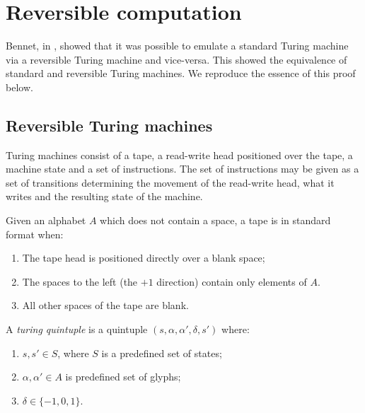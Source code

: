 
\chapter{Reversible computation}\label{chap:reversible_computation}

Bennet, in \cite{bennett:1973reverse}, showed that it was possible to
emulate a standard Turing machine via a reversible Turing machine and
vice-versa. This showed the equivalence of  standard and reversible
Turing machines. We reproduce the essence of this proof below.

\section{Reversible Turing machines} %
\label{sec:reversible_turing_machines}

Turing machines consist of a tape, a read-write head positioned over
the tape, a machine state and a set of instructions. The set of instructions
may be given as a set of transitions determining the movement of the
read-write head, what it writes and the resulting state of the machine.

\begin{definition}\label{def:standard_tape}
  Given an alphabet $A$ which does not contain a space, a tape is in standard
  format when:
  \begin{enumerate}
    \item The tape head is positioned directly over a blank space;
    \item The spaces to the left (the $+1$ direction) contain only
    elements of $A$.
    \item All other spaces of the tape are blank.
  \end{enumerate}
\end{definition}

\begin{definition}\label{def:turing_quintuple}
  A \emph{turing quintuple} is a quintuple $(s,\alpha,\alpha',\delta,s')$ where:
  \begin{enumerate}
    \item $s,s' \in S$, where $S$ is a predefined set of states;
    \item $\alpha, \alpha'\in A$ is predefined set of glyphs;
    \item $\delta \in \{-1,0,1\}$.
  \end{enumerate}
\end{definition}


